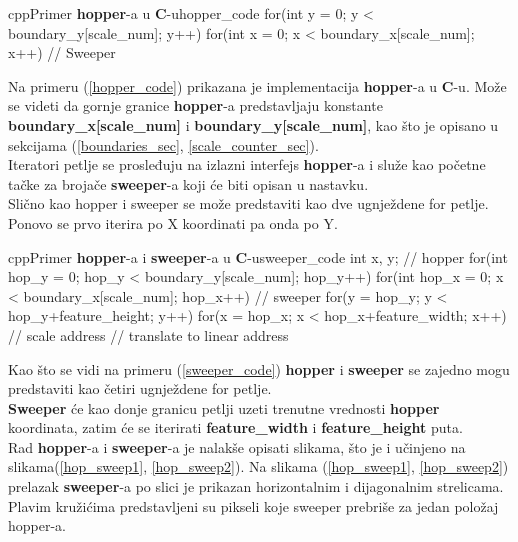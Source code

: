\begin{code}[H]{cpp}{Primer \textbf{hopper}-a u \textbf{C}-u}{hopper_code}
for(int y = 0; y < boundary_y[scale_num]; y++){
  for(int x = 0; x < boundary_x[scale_num]; x++){
    // Sweeper
  }
}
\end{code}

Na primeru (\ref{hopper_code}) prikazana je implementacija \textbf{hopper}-a u
\textbf{C}-u.
Može se videti da gornje granice \textbf{hopper}-a predstavljaju konstante
\textbf{boundary\_x[scale\_num]} i \textbf{boundary\_y[scale\_num]}, kao što je
opisano u sekcijama (\ref{boundaries_sec},
\ref{scale_counter_sec}). \\

Iteratori petlje se prosleđuju na izlazni interfejs \textbf{hopper}-a i služe
kao početne tačke za brojače \textbf{sweeper}-a koji će biti opisan u nastavku. \\

Slično kao hopper i sweeper se može predstaviti kao dve ugnježdene for petlje. \\
Ponovo se prvo iterira po X koordinati pa onda po Y.

\begin{code}[H]{cpp}{Primer \textbf{hopper}-a i \textbf{sweeper}-a u \textbf{C}-u}{sweeper_code}
int x, y;
// hopper
for(int hop_y = 0; hop_y < boundary_y[scale_num]; hop_y++){
  for(int hop_x = 0; x < boundary_x[scale_num]; hop_x++){
    // sweeper
    for(y = hop_y; y < hop_y+feature_height; y++){
      for(x = hop_x; x < hop_x+feature_width; x++){
        // scale address
        // translate to linear address
      }
    }
  }
}
\end{code}

Kao što se vidi na primeru (\ref{sweeper_code}) \textbf{hopper} i \textbf{sweeper} se zajedno mogu
predstaviti kao četiri ugnježdene for petlje. \\
\textbf{Sweeper} će kao donje granicu petlji uzeti trenutne vrednosti
\textbf{hopper} koordinata, zatim će se iterirati \textbf{feature\_width} i \textbf{feature\_height} puta. \\


Rad \textbf{hopper}-a i \textbf{sweeper}-a je nalakše opisati slikama, što je i
učinjeno na slikama(\ref{hop_sweep1}, \ref{hop_sweep2}).
Na slikama (\ref{hop_sweep1}, \ref{hop_sweep2}) prelazak \textbf{sweeper}-a po slici je
prikazan horizontalnim i dijagonalnim strelicama.
Plavim kružićima predstavljeni su pikseli koje sweeper prebriše za jedan
položaj hopper-a.\\

